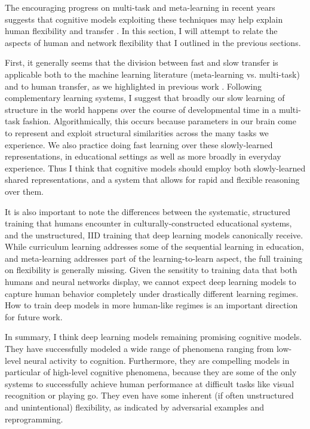 \documentclass[11pt]{article}
\begin{document}
The encouraging progress on multi-task and meta-learning in recent years suggests that cognitive models exploiting these techniques may help explain human flexibility and transfer \citep{Hansen2017}. In this section, I will attempt to relate the aspects of human and network flexibility that I outlined in the previous sections. \par 
First, it generally seems that the division between fast and slow transfer is applicable both to the machine learning literature (meta-learning vs. multi-task) and to human transfer, as we highlighted in previous work \citep{Lampinen2017a}. Following complementary learning systems, I suggest that broadly our slow learning of structure in the world happens over the course of developmental time in a multi-task fashion. Algorithmically, this occurs because parameters in our brain come to represent and exploit structural similarities across the many tasks we experience. We also practice doing fast learning over these slowly-learned representations, in educational settings as well as more broadly in everyday experience. Thus I think that cognitive models should employ both slowly-learned shared representations, and a system that allows for rapid and flexible reasoning over them. \par 
It is also important to note the differences between the systematic, structured training that humans encounter in culturally-constructed educational systems, and the unstructured, IID training that deep learning models canonically receive. While curriculum learning addresses some of the sequential learning in education, and meta-learning addresses part of the learning-to-learn aspect, the full training on flexibility is generally missing. Given the sensitity to training data that both humans and neural networks display, we cannot expect deep learning models to capture human behavior completely under drastically different learning regimes. How to train deep models in more human-like regimes is an important direction for future work.  \par
In summary, I think deep learning models remaining promising cognitive models. They have successfully modeled a wide range of phenomena ranging from low-level neural activity to cognition. Furthermore, they are compelling models in particular of high-level cognitive phenomena, because they are some of the only systems to successfully achieve human performance at difficult tasks like visual recognition or playing go. They even have some inherent (if often unstructured and unintentional) flexibility, as indicated by adversarial examples and reprogramming. \par
\end{document}
